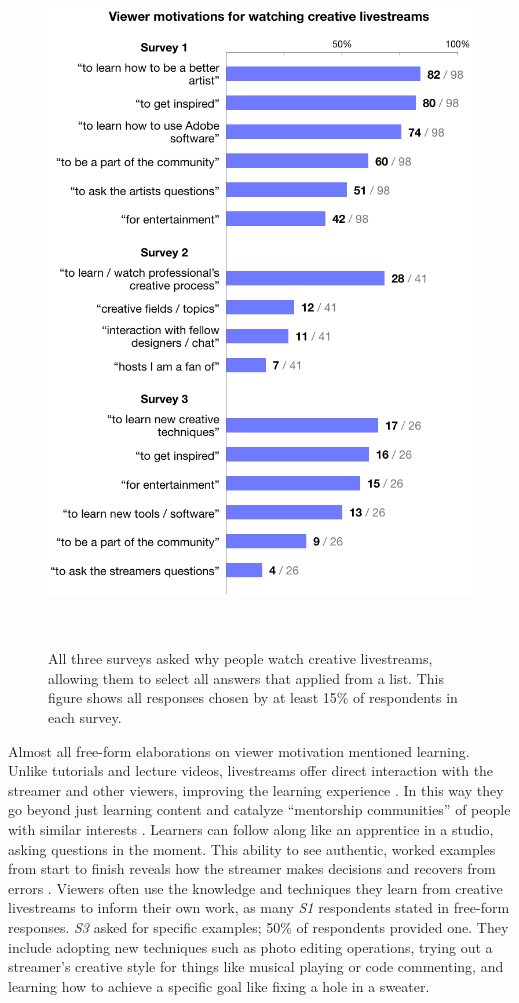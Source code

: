 \begin{figure}[b!]
\centering
  \includegraphics[width=1\columnwidth]{livestreams/figures/survey_responses.png}
  \caption{All three surveys asked why people watch creative livestreams, allowing them to select all answers that applied from a list. This figure shows all responses chosen by at least 15\% of respondents in each survey. }~\label{fig:livestream_survey_responses}
\vspace{-0.15in}
\end{figure}

Almost all free-form elaborations on viewer motivation mentioned learning. Unlike tutorials and lecture videos, livestreams offer direct interaction with the streamer and other viewers, improving the learning experience \cite{Lu2019, Faas2018}. In this way they go beyond just learning content and catalyze ``mentorship communities'' of people with similar interests \cite{Faas2018}. Learners can follow along like an apprentice in a studio, asking questions in the moment. This ability to see authentic, worked examples from start to finish reveals how the streamer makes decisions and recovers from errors \cite{Faas2018}. Viewers often use the knowledge and techniques they learn from creative livestreams to inform their own work, as many \textit{S1} respondents stated in free-form responses. \textit{S3} asked for specific examples; 50\% of respondents provided one. They include adopting new techniques such as photo editing operations, trying out a streamer's creative style for things like musical playing or code commenting, and learning how to achieve a specific goal like fixing a hole in a sweater.


